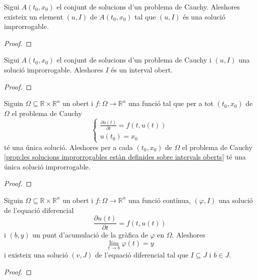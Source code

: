 \documentclass[../Apunts.tex]{subfiles}
\begin{document}
	\begin{proposition}
		\label{prop:existeixen solucions improrrogables}
		Sigui \(A(t_{0},x_{0})\) el conjunt de solucions d'un problema de Cauchy. Aleshores existeix un element \((u,I)\) de \(A(t_{0},x_{0})\) tal que \((u,I)\) és una solució improrrogable.
		\begin{proof}
		\end{proof}
	\end{proposition}
	\begin{proposition}
		\label{prop:les solucions improrrogables estàn definides sobre intervals oberts}
		Sigui \(A(t_{0},x_{0})\) el conjunt de solucions d'un problema de Cauchy i \((u,I)\) una solució improrrogable. Aleshores \(I\) és un interval obert.
		\begin{proof}
		\end{proof}
	\end{proposition}
	\begin{proposition}
		\label{prop:la solució improrrogable és única}
		Siguin \(\Omega\subseteq\mathbb{R}\times\mathbb{R}^{n}\) un obert i \(f\colon\Omega\longrightarrow\mathbb{R}^{n}\) una funció tal que per a tot \((t_{0},x_{0})\) de \(\Omega\) el problema de Cauchy
		\begin{equation}
			\label{prop:la solució improrrogable és única:eq1}
			\begin{cases*}
				\displaystyle \frac{\partial u(t)}{\partial t}=f(t,u(t)) \\
				\displaystyle u(t_{0})=x_{0}
			\end{cases*}
		\end{equation}
		té una única solució. Aleshores per a cada \((t_{0},x_{0})\) de \(\Omega\) el problema de Cauchy \eqref{prop:les solucions improrrogables estàn definides sobre intervals oberts} té una única solució improrrogable.
		\begin{proof}
		\end{proof}
	\end{proposition}
	\begin{theorem}
		\label{thm:Lema de Wintner}
		Siguin \(\Omega\subseteq\mathbb{R}\times\mathbb{R}^{n}\) un obert i \(f\colon\Omega\longrightarrow\mathbb{R}^{n}\) una funció contínua, \((\varphi,I)\) una solució de l'equació diferencial
		\[\frac{\partial u(t)}{\partial t}=f(t,u(t))\]
		i \((b,y)\) un punt d'acumulació de la gràfica de \(\varphi\) en \(\Omega\). Aleshores
		\[\lim_{t\to b}\varphi(t)=y\]
		i existeix una solució \((v,J)\) de l'equació diferencial tal que \(I\subseteq J\) i \(b\in J\).
		\begin{proof}
		\end{proof}
	\end{theorem}
	
\end{document}
